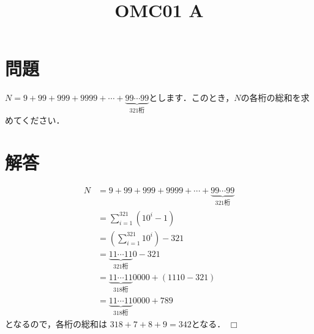 \documentclass[uplatex,dvipdfmx,a4paper]{jsarticle}
\title{OMC01 A}
\date{}
\author{}
\def\qed{\hfill $\Box$}
\newenvironment{question}{\section*{問題}}{}
\newenvironment{solution}{\section*{解答}}{\qed}
\begin{document}
\maketitle
\begin{question}
    $N=9+99+999+9999+\cdots+\underbrace{99 \cdots 99}_{321 \text{桁}}$とします．このとき，$N$の各桁の総和を求めてください．
\end{question}

\begin{solution}
    \begin{align*}
        N &= 9+99+999+9999+\cdots+\underbrace{99 \cdots 99}_{321 \text{桁}} \\
        &= \sum_{i=1}^{321}\left(10^i-1\right) \\
        &= \left(\sum_{i=1}^{321}10^i\right) -321 \\
        &= \underbrace{11 \cdots 11}_{321桁}0-321 \\
        &= \underbrace{11 \cdots 11}_{318桁}0000+(1110-321) \\
        &= \underbrace{11 \cdots 11}_{318桁}0000+789
    \end{align*}
    となるので，各桁の総和は $318+7+8+9=342$となる．
\end{solution}
\end{document}
